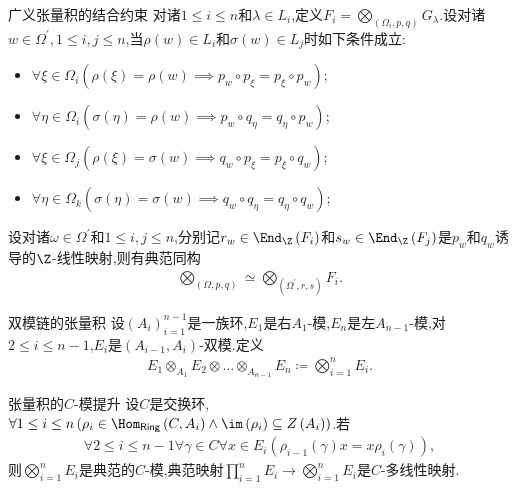 \begin{theorem}{广义张量积的结合约束}{}
	对诸$1\leq i\leq n$和$\lambda\in L_{i}$,定义$F_{i}=\bigotimes\limits_{\left(\Omega_{i},p,q\right)}G_{\lambda}$.设对诸$w\in\Omega^{\prime},1\leq i,j\leq n$,当$\rho\left(w\right)\in L_{i}$和$\sigma\left(w\right)\in L_{j}$时如下条件成立:
	\begin{itemize}
		\item $\forall\xi\in\Omega_{i}\left(\rho\left(\xi\right)=\rho\left(w\right)\implies p_{w}\circ p_{\xi}=p_{\xi}\circ p_{w}\right)$;
		\item $\forall\eta\in\Omega_{i}\left(\sigma\left(\eta\right)=\rho\left(w\right)\implies p_{w}\circ q_{\eta}=q_{\eta}\circ p_{w}\right)$;
		\item $\forall\xi\in\Omega_{j}\left(\rho\left(\xi\right)=\sigma\left(w\right)\implies q_{w}\circ p_{\xi}=p_{\xi}\circ q_{w}\right)$;
		\item $\forall\eta\in\Omega_{k}\left(\sigma\left(\eta\right)=\sigma\left(w\right)\implies q_{w}\circ q_{\eta}=q_{\eta}\circ q_{w}\right)$;
	\end{itemize}
	设对诸$\omega\in\Omega^{\prime}$和$1\leq i,j\leq n$,分别记$r_{w}\in\End_{\Z}\left(F_{i}\right)$和$s_{w}\in\End_{\Z}\left(F_{j}\right)$是$p_{w}$和$q_{w}$诱导的$\Z$-线性映射,则有典范同构
	\begin{align*}
		\bigotimes\limits_{\left(\Omega,p,q\right)}\simeq\bigotimes\limits_{\left(\Omega^{\prime},r,s\right)}F_{i}.
	\end{align*}
\end{theorem}

\begin{definition}{双模链的张量积}{}
	设$\left(A_{i}\right)_{i=1}^{n-1}$是一族环,$E_{1}$是右$A_{1}$-模,$E_{n}$是左$A_{n-1}$-模,对$2\leq i\leq n-1$,$E_{i}$是$\left(A_{i-1},A_{i}\right)$-双模.定义
	\begin{align*}
		E_{1}\otimes_{A_{1}}E_{2}\otimes\ldots\otimes_{A_{n-1}}E_{n}\coloneq\bigotimes\limits_{i=1}^{n}E_{i}.
	\end{align*}
\end{definition}

\begin{remark}{张量积的$C$-模提升}{}
	设$C$是交换环,$\forall 1\leq i\leq n\left(\rho_{i}\in\Hom_{\mathsf{Ring}}\left(C,A_{i}\right)\wedge\im\left(\rho_{i}\right)\subseteq Z\left(A_{i}\right)\right)$.若
	\begin{align*}
		\forall 2\leq i\leq n-1\forall\gamma\in C\forall x\in E_{i}\left(\rho_{i-1}\left(\gamma\right)x=x\rho_{i}\left(\gamma\right)\right),
	\end{align*}
	则$\bigotimes\limits_{i=1}^{n}E_{i}$是典范的$C$-模,典范映射$\prod\limits_{i=1}^{n}E_{i}\to\bigotimes\limits_{i=1}^{n}E_{i}$是$C$-多线性映射.
\end{remark}

